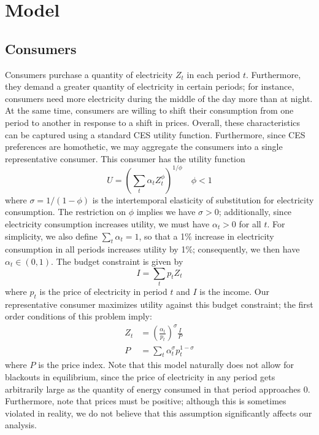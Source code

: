\documentclass[11pt,a4paper,leqno]{extarticle}
\begin{document}
	
	
	
	\section{Model}
	\label{sec:Model}
	
	\subsection{Consumers}
	\label{sec:consumers}
	
	Consumers purchase a quantity of electricity $Z_t$ in each period $t$. Furthermore, they demand a greater quantity of electricity in certain periods; for instance, consumers need more electricity during the middle of the day more than at night. At the same time, consumers are willing to shift their consumption from one period to another in response to a shift in prices. Overall, these characteristics can be captured using a standard CES utility function.  Furthermore, since CES preferences are homothetic, we may aggregate the consumers into a single representative consumer. This consumer has the utility function
	\begin{equation}
	U = \left( \sum_t \alpha_t Z_t^\phi  \right)^{1/\phi} \quad \phi < 1
	\end{equation}
	where $\sigma = 1/(1-\phi)$ is the intertemporal elasticity of substitution for electricity consumption. The restriction on $\phi$ implies we have  $\sigma > 0$; additionally, since electricity consumption increases utility, we must have $\alpha_t > 0$ for all $t$.  For simplicity, we also define $\sum_t \alpha_t = 1$, so that a 1\% increase in electricity consumption in all periods increases utility by 1\%; consequently, we then have $\alpha_t \in (0,1)$. The budget constraint is given by
	\begin{equation}
	I = \sum_t p_t Z_t
	\end{equation}
	where $p_t$ is the price of electricity in period $t$ and $I$ is the income. Our representative consumer maximizes utility against this budget constraint; the first order conditions of this problem imply:
	\begin{align}\label{eq:demand}
	Z_t &= \left(\frac{\alpha_t}{p_t} \right)^\sigma \frac{I}{P} \\\label{eq:priceindex}
	P &= \sum_t \alpha_t^\sigma p_t^{1-\sigma}
	\end{align}
	where $P$ is the price index. Note that this model naturally does not allow for blackouts in equilibrium, since the price of electricity in any period gets arbitrarily large as the quantity of energy consumed in that period approaches 0. Furthermore, note that prices must be positive; although this is sometimes violated in reality, we do not believe that this assumption significantly affects our analysis. 
	
\end{document}
